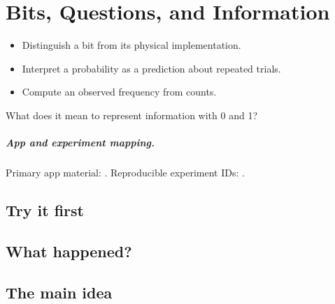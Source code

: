 \chapter{Bits, Questions, and Information}
\label{chap:bits-questions-and-information}

\begin{learningobjectives}
\begin{itemize}
  \item Distinguish a bit from its physical implementation.
  \item Interpret a probability as a prediction about repeated trials.
  \item Compute an observed frequency from counts.
\end{itemize}
\end{learningobjectives}

\begin{openingquestion}
What does it mean to represent information with 0 and 1?
\end{openingquestion}

\paragraph{App and experiment mapping.}
Primary app material: . Reproducible experiment IDs:
.

\section{Try it first}
\begin{tryit}
\end{tryit}

\section{What happened?}

\section{The main idea}
\begin{coreidea}
\end{coreidea}

